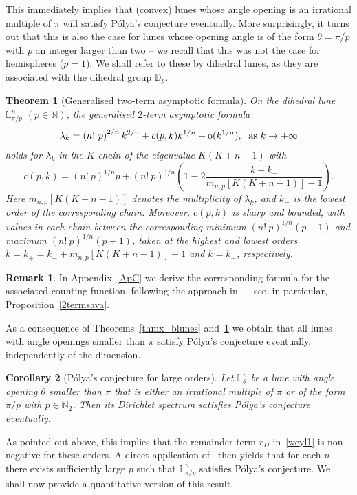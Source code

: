 \documentclass[11pt,a4paper,times]{amsart}
\theoremstyle{plain}
\newtheorem{thmx}{Theorem}%
\newtheorem{corx}[thmx]{Corollary}%
\theoremstyle{definition}
\newtheorem{remark}{Remark}[section]
\numberwithin{equation}{section}
\newcommand{\N}{\mathbb{N}}
\newcommand{\so}{{\rm o}}
\newcommand{\lune}[2]{\mathbb{L}^{#1}_{#2}}
\begin{document}
This immediately implies that (convex) lunes whose angle opening is an irrational multiple of $\pi$
will satisfy P\'{o}lya's conjecture eventually. More surprisingly, it turns out that this is also the case for
lunes whose opening angle is of the form $\theta=\pi/p$ with $p$ an integer larger than two -- we recall that
this was not the case for hemispheres ($p=1$). We shall refer to these by dihedral lunes, as they are associated
with the dihedral group $\mathbb{D}_p$.
%
\begin{thmx}[Generalised two-term asymptotic formula]\label{thmxeventually}
 On the dihedral lune $\lune{n}{\pi/p}$  $(p\in \N)$, the generalised $2$-term asymptotic formula
 \[\lambda_k= \left(n!\ p\right)^{2/n} k^{2/n}+  c(p,k)k^{1/n}+\so(k^{1/n}),\; \mbox{ as } k\to +\infty\]
 holds for $\lambda_k$ in the $K$-chain of the eigenvalue $K(K+n-1)$ with
 \[
 c(p,k)=\left(n!\ p\right)^{1/n}p+ \left(n!\ p\right)^{1/n}\left(1-2 \frac{k-k_-}{m_{n,p}[K(K+n-1)]-1}\right).
 \]
 Here $m_{n,p}[K(K+n-1)]$ denotes the multiplicity of $\lambda_{k}$, and $k_-$ is the lowest order of the corresponding chain.
 Moreover, $c(p,k)$  is sharp and bounded, with values in each chain between the corresponding minimum $\left(n!\ p\right)^{1/n}(p-1)$
 and maximum $\left(n!\ p\right)^{1/n}(p+1)$, taken at the highest and lowest orders $k=k_{+}=k_{-}+m_{n,p}[K(K+n-1)]-1$ and
 $k=k_-$, respectively.
\end{thmx}
\begin{remark}
In Appendix~\ref{ApC} we derive the corresponding formula for the associated counting function, following the approach in~\cite{sava} -- see, in particular, Proposition~\ref{2termsava}.
\end{remark}
%
As a consequence of Theorems~\ref{thmx_blunes} and~\ref{thmxeventually} we obtain that all lunes with angle
openings smaller than $\pi$ satisfy P\'{o}lya's conjecture eventually, independently of the dimension.
\begin{corx}[P\'{o}lya's conjecture for large orders] \label{CorC}
 Let $\lune{n}{\theta}$ be a lune with angle opening $\theta$ smaller than $\pi$ {that is either an
 irrational multiple of $\pi$ or of the form $\pi/p$ with $p\in \N_2$}. Then its Dirichlet spectrum
 satisfies P\'{o}lya's conjecture eventually.
 \end{corx}
As pointed out above, this implies that the remainder term $r_{D}$ in~\eqref{weyl1} is non-negative for these orders.
A direct application of~\cite[Lemma 1]{fs} then yields that for each $n$ there exists sufficiently large $p$ such
that $\lune{n}{\pi/p}$  satisfies P\'{o}lya's conjecture. We shall now provide a quantitative version of this result.
\end{document}
